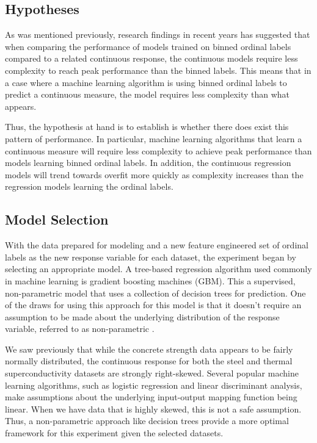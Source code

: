 \documentclass[10pt]{article}\usepackage[]{graphicx}\usepackage[]{xcolor}
\begin{document}
\subsection{Hypotheses}
As was mentioned previously, research findings in recent years has suggested that when comparing the performance of models trained on binned ordinal labels compared to a related continuous response, the continuous models require less complexity to reach peak performance than the binned labels. This means that in a case where a machine learning algorithm is using binned ordinal labels to predict a continuous measure, the model requires less complexity than what appears.

Thus, the hypothesis at hand is to establish is whether there does exist this pattern of performance. In particular, machine learning algorithms that learn a continuous measure will require less complexity to achieve peak performance than models learning binned ordinal labels. In addition, the continuous regression models will trend towards overfit more quickly as complexity increases than the regression models learning the ordinal labels.


\subsection{Model Selection}
With the data prepared for modeling and a new feature engineered set of ordinal labels as the new response variable for each dataset, the experiment began by selecting an appropriate model. A tree-based regression algorithm used commonly in machine learning is gradient boosting machines (GBM). This a supervised, non-parametric model that uses a collection of decision trees for prediction. One of the draws for using this approach for this model is that it doesn't require an assumption to be made about the underlying distribution of the response variable, referred to as non-parametric \cite{Support:GBM}. 

We saw previously that while the concrete strength data appears to be fairly normally distributed, the continuous response for both the steel and thermal superconductivity datasets are strongly right-skewed. Several popular machine learning algorithms, such as logistic regression and linear discriminant analysis, make assumptions about the underlying input-output mapping function being linear. When we have data that is highly skewed, this is not a safe assumption. Thus, a non-parametric approach like decision trees provide a more optimal framework for this experiment given the selected datasets.
\end{document}
